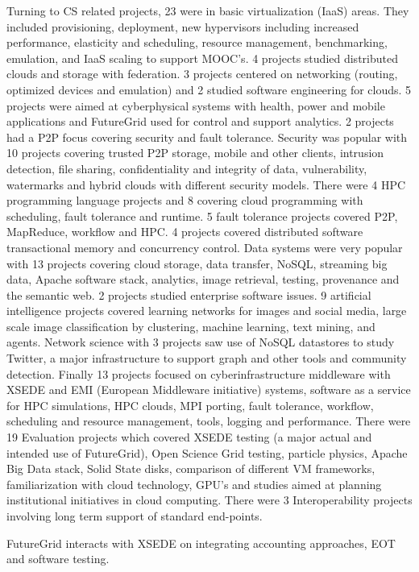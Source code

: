 Turning to CS related projects, 23 were in basic virtualization (IaaS) areas. They included provisioning, deployment, new hypervisors including increased performance, elasticity and scheduling, resource management, benchmarking, emulation, and IaaS scaling to support MOOC’s. 4 projects studied distributed clouds and storage with federation. 3 projects centered on networking (routing, optimized devices and emulation) and 2 studied software engineering for clouds. 5 projects were aimed at cyberphysical systems with health, power and mobile applications and FutureGrid used for control and support analytics. 2 projects had a P2P focus covering security and fault tolerance. Security was popular with 10 projects covering trusted P2P storage, mobile and other clients, intrusion detection, file sharing, confidentiality and integrity of data, vulnerability, watermarks and hybrid clouds with different security models. There were 4 HPC programming language projects and 8 covering cloud programming with scheduling, fault tolerance and runtime. 5 fault tolerance projects covered P2P, MapReduce, workflow and HPC. 4 projects covered distributed software transactional memory and concurrency control. Data systems were very popular with 13 projects covering cloud storage, data transfer, NoSQL, streaming big data, Apache software stack, analytics, image retrieval, testing, provenance and the semantic web. 2 projects studied enterprise software issues. 9 artificial intelligence projects covered learning networks for images and social media, large scale image classification by clustering, machine learning, text mining, and agents. Network science with 3 projects saw use of NoSQL datastores to study Twitter, a major infrastructure to support graph and other tools and community detection. Finally 13 projects focused on cyberinfrastructure middleware with XSEDE and EMI (European Middleware initiative) systems, software as a service for HPC simulations, HPC clouds, MPI porting, fault tolerance, workflow, scheduling and resource management, tools, logging and performance.
There were 19 Evaluation projects which covered XSEDE testing (a major actual and intended use of FutureGrid), Open Science Grid testing, particle physics, Apache Big Data stack, Solid State disks, comparison of different VM frameworks, familiarization with cloud technology, GPU’s and studies aimed at planning institutional initiatives in cloud computing. There were 3 Interoperability projects involving long term support of standard end-points. 

FutureGrid interacts with XSEDE on integrating accounting approaches, EOT and software testing.
